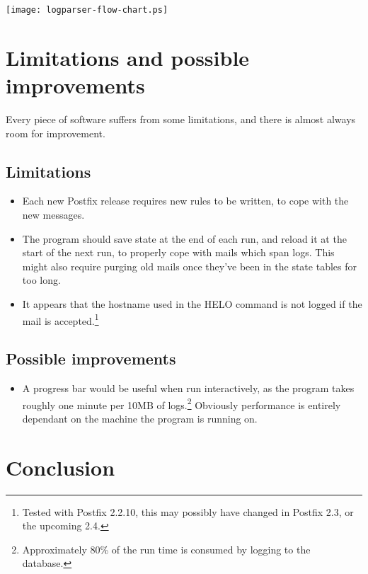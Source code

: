 \documentclass[a4paper,12pt,draft]{article}
\begin{document}
\texttt{[image: logparser-flow-chart.ps]}
\label{flow-chart}

\section{Limitations and possible improvements}

Every piece of software suffers from some limitations, and there is almost
always room for improvement.

\subsection{Limitations}

\begin{itemize}

    \item Each new Postfix release requires new rules to be written, to
        cope with the new messages.

    \item The program should save state at the end of each run, and reload
        it at the start of the next run, to properly cope with mails which
        span logs.  This might also require purging old mails once they've
        been in the state tables for too long.

    \item It appears that the hostname used in the HELO command is not
        logged if the mail is accepted.\footnote{Tested with Postfix
        2.2.10, this may possibly have changed in Postfix 2.3, or the
        upcoming 2.4.}

\end{itemize}

\subsection{Possible improvements}
\begin{itemize}

    \item A progress bar would be useful when run interactively, as the
        program takes roughly one minute per 10MB of
        logs.\footnote{Approximately 80\% of the run time is consumed by
        logging to the database.}  Obviously performance is entirely
        dependant on the machine the program is running on.

\end{itemize}

\section{Conclusion}

\appendix
\end{document}

